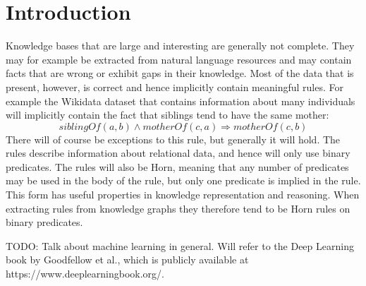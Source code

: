 \chapter{Introduction}

Knowledge bases that are large and interesting are generally not complete. They may for example be extracted from natural language resources and may contain facts that are wrong or exhibit gaps in their knowledge. Most of the data that is present, however, is correct and hence implicitly contain meaningful rules. For example the Wikidata dataset that contains information about many individuals will implicitly contain the fact that siblings tend to have the same mother:
\[siblingOf(a, b) \wedge motherOf(c, a) \Rightarrow motherOf(c, b)\]
There will of course be exceptions to this rule, but generally it will hold. The rules describe information about relational data, and hence will only use binary predicates. The rules will also be Horn, meaning that any number of predicates may be used in the body of the rule, but only one predicate is implied in the rule. This form has useful properties in knowledge representation and reasoning. When extracting rules from knowledge graphs they therefore tend to be Horn rules on binary predicates.



TODO: Talk about machine learning in general. Will refer to the Deep Learning book by Goodfellow et al., which is publicly available at https://www.deeplearningbook.org/.